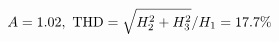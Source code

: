 \documentclass[preview]{standalone}
\begin{document}
\begin{align*}
\special{dvisvgm:raw <g id='unique000'>}A=1.02,\ \text{THD}=\sqrt{H_2^2+H_3^2}/H_1=17.7\%\special{dvisvgm:raw </g>}
\end{align*}
\end{document}
